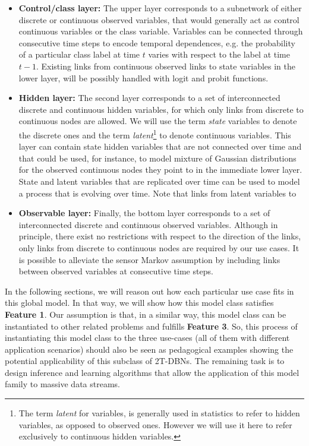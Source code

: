 \begin{itemize}

\item \textbf{Control/class layer:} The upper layer corresponds to a subnetwork of either discrete or continuous observed variables, that would generally act as control continuous variables or the class variable. Variables can be connected through consecutive time steps to encode temporal dependences, e.g. the probability of a particular class label at time $t$ varies with respect to the label at time $t-1$. Existing links from continuous observed links to state variables in the lower layer, will be possibly handled with logit and probit functions.

\item \textbf{Hidden layer:}  The second layer corresponds to a set of interconnected discrete and continuous hidden variables, for which only links from discrete to continuous nodes are allowed. We will use the term \textit{state} variables to denote the discrete ones and the term \textit{latent}\footnote{The term \textit{latent} for variables, is generally used in statistics to refer to hidden variables, as opposed to observed ones. However we will use it here to refer exclusively to continuous hidden variables.} to denote continuous variables. This layer can contain state hidden variables that are not connected over time and that could be used, for instance, to model mixture of Gaussian distributions for the observed continuous nodes they point to in the immediate lower layer. State and latent variables that are replicated over time can be used to model a process that is evolving over time. Note that links from latent variables to 

\item \textbf{Observable layer:} Finally, the bottom layer corresponds to a set of interconnected discrete and continuous observed variables. Although in principle, there exist no restrictions with respect to the direction of the links, only links from discrete to continuous nodes are required by our use cases. It is possible to alleviate the sensor Markov assumption by including links between observed variables at consecutive time steps.

\end{itemize} 


In the following sections, we will reason out how each particular use case fits in this global model. In that way, we will show how this model class satisfies \textbf{Feature 1}. Our assumption is that, in a similar way, this model class can be instantiated to other related problems and fulfills \textbf{Feature 3}. So, this process of instantiating this model class to the three use-cases (all of them with different application scenarios) should also be seen as pedagogical examples showing the potential applicability of this subclass of 2T-DBNs. The remaining task is to design inference and learning algorithms that allow the application of this model family to massive data streams. 


